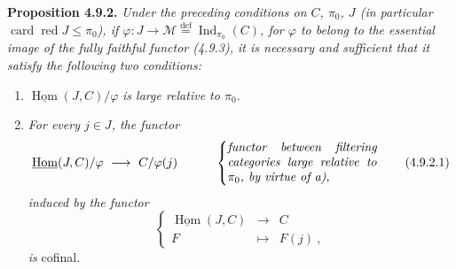 \documentclass[11pt]{article}
\newcommand{\msp}[1]{\marginpar{\footnotesize [#1]}}
\newcommand{\Ind}{\operatorname{Ind}}
\newcommand{\card}{\operatorname{card}}
\newcommand{\red}{\operatorname{\text{red}}}
\newcommand{\uHom}{\underline{\operatorname{Hom}}}
\newcommand{\cM}{\mathcal{M}}
\newcommand{\defeq}{\overset{\text{def}}{=}}
\begin{document}
\textbf{Proposition 4.9.2.} \textit{Under the preceding conditions on $C$, $\pi_0$, $J$ (in particular} $\card\red J \leqslant \pi_0$\textit{), if $\varphi : J \longrightarrow \cM \defeq \Ind_{\pi_0}(C)$, for $\varphi$ to belong to the essential image of the fully faithful functor (4.9.3), it is necessary and sufficient that it satisfy the following two conditions:}

\msp{page 219}

\begin{enumerate}[leftmargin=*]
\item[\textit{a)}] $\uHom(J, C)/\varphi$ \textit{is large relative to $\pi_0$.}
\item[\textit{b)}] \textit{For every $j \in J$, the functor}
\[
\uHom(J, C)/\varphi \ \longrightarrow\ C/\varphi(j) \qquad\quad
\left\{
\parbox{0.35\textwidth}{\textit{functor between filtering categories large relative to $\pi_0$, by virtue of a),}}
\right. \tag*{(4.9.2.1)}
\]
\textit{induced by the functor}
\[
\left\{
\begin{array}{rcl}
\uHom(J, C) & \longrightarrow & C \\
F & \longmapsto & F(j)\ ,
\end{array}
\right. \tag*{(4.9.2.2)}
\]
\textit{is} cofinal.
\end{enumerate}
\end{document}
